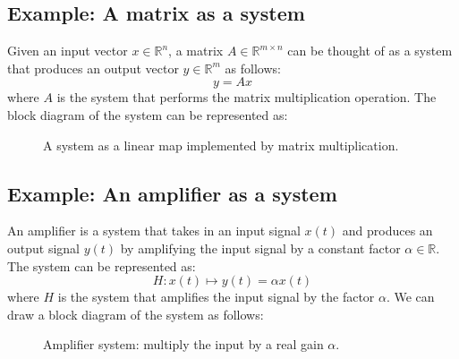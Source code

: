 \documentclass{ee102_notes}
\begin{document}
\subsection{Example: A matrix as a system}
Given an input vector $x \in \mathbb{R}^n$, a matrix $A \in \mathbb{R}^{m \times n}$ can be thought of as a system that produces an output vector $y \in \mathbb{R}^m$ as follows:
\[
    y = Ax
\]
where $A$ is the system that performs the matrix multiplication operation. The block diagram of the system can be represented as:
\begin{figure}[h]
\centering
{}
\caption{A system as a linear map implemented by matrix multiplication.}
\end{figure}

\subsection{Example: An amplifier as a system}
An amplifier is a system that takes in an input signal $x(t)$ and produces an output signal $y(t)$ by amplifying the input signal by a constant factor $\alpha \in \mathbb{R}$. The system can be represented as:
\[
    H: x(t) \mapsto y(t) = \alpha x(t)
\]
where $H$ is the system that amplifies the input signal by the factor $\alpha$. We can draw a block diagram of the system as follows:
\begin{figure}[h]
\centering
{}
\caption{Amplifier system: multiply the input by a real gain \(\alpha\).}
\end{figure}
\end{document}
